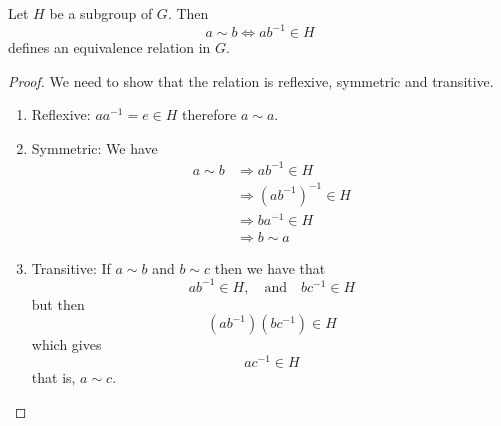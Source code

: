 \documentclass[12pt]{article}
\theoremstyle{definition}
\theoremstyle{remark}
\numberwithin{equation}{subsection}
\begin{document}
Let $H$ be a subgroup of $G$.  Then 
$$a\sim b \Longleftrightarrow ab^{-1} \in H$$    
defines an equivalence relation in $G$.

\begin{proof} We need to show that the relation is reflexive,
  symmetric and transitive.
  \begin{enumerate}
\item Reflexive: $aa^{-1} = e \in H$ therefore $a\sim a$.
  \item  Symmetric: We have 
    \begin{align*}
     a\sim b &\Rightarrow   ab^{-1} \in H \\
             &\Rightarrow \left(ab^{-1}\right)^{-1}\in H\\ 
             &\Rightarrow ba^{-1}\in H\\ 
             &\Rightarrow b\sim a
    \end{align*}
  \item Transitive: If $a\sim b$ and $b\sim c$ then we have that
$$ab^{-1} \in H, \quad \text{and} \quad bc^{-1} \in H$$
but then  
$$\left(ab^{-1}\right)\left(bc^{-1}\right) \in H $$
which gives
$$ac^{-1} \in H$$
that is, $a\sim c$.
\end{enumerate}
\end{proof}
\end{document}
